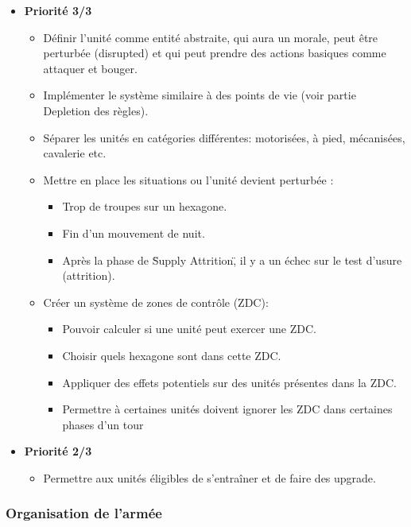 \documentclass{article}[a4paper, 12pt]
\begin{document}
\begin{itemize}
    \item \textbf{Priorité 3/3}
    \begin{itemize}
        \item Définir l'unité comme entité abstraite, qui aura un morale, peut être perturbée (disrupted) et qui peut prendre des actions basiques comme attaquer et bouger.
        \item Implémenter le système similaire à des points de vie (voir partie Depletion des règles).
        \item Séparer les unités en catégories différentes: motorisées, à pied, mécanisées, cavalerie etc.
        \item Mettre en place les situations ou l'unité devient perturbée :
        \begin{itemize}
            \item Trop de troupes sur un hexagone.
            \item Fin d'un mouvement de nuit.
            \item Après la phase de \"Supply Attrition\", il y a un échec sur le test d'usure (attrition).
        \end{itemize}
        \item Créer un système de zones de contrôle (ZDC):
        \begin{itemize}
            \item Pouvoir calculer si une unité peut exercer une ZDC.
            \item Choisir quels hexagone sont dans cette ZDC.
            \item Appliquer des effets potentiels sur des unités présentes dans la ZDC.
            \item Permettre à certaines unités doivent ignorer les ZDC dans certaines phases d'un tour
        \end{itemize}
    \end{itemize}
    \item \textbf{Priorité 2/3}
    \begin{itemize}
        \item Permettre aux unités éligibles de s'entraîner et de faire des upgrade.
    \end{itemize}
\end{itemize}

\subsubsection{Organisation de l'armée}
\end{document}
